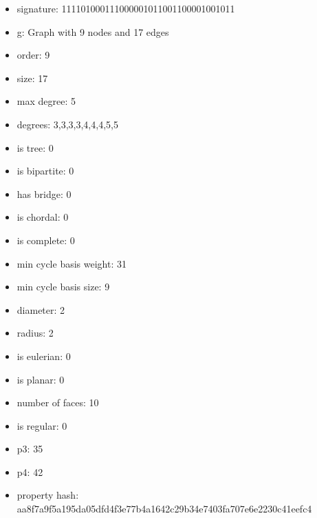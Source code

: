 \newpage
\begin{figure}
\end{figure}
\begin{itemize}
\item signature: 111101000111000001011001100001001011
\item g: Graph with 9 nodes and 17 edges
\item order: 9
\item size: 17
\item max degree: 5
\item degrees: 3,3,3,3,4,4,4,5,5
\item is tree: 0
\item is bipartite: 0
\item has bridge: 0
\item is chordal: 0
\item is complete: 0
\item min cycle basis weight: 31
\item min cycle basis size: 9
\item diameter: 2
\item radius: 2
\item is eulerian: 0
\item is planar: 0
\item number of faces: 10
\item is regular: 0
\item p3: 35
\item p4: 42
\item property hash: aa8f7a9f5a195da05dfd4f3e77b4a1642c29b34e7403fa707e6e2230c41eefc4
\end{itemize}
